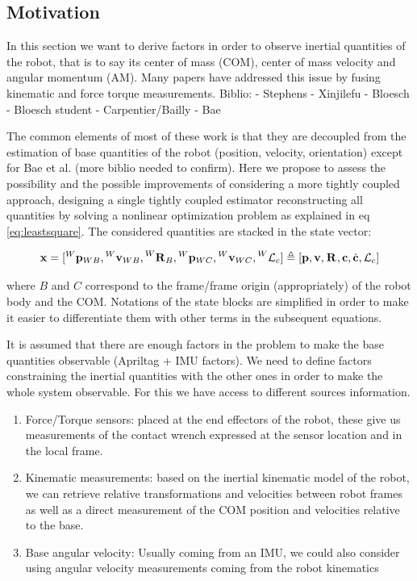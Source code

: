 \documentclass[11pt]{article}
\newcommand{\Rot}[2]{\prescript{#1}{}{\bfR}_{#2}}
\newcommand{\posi}[2]{\prescript{#1}{}{\bfp}_{#2}}
\newcommand{\vel}[2]{\prescript{#1}{}{\bfv}_{#2}}
\newcommand{\AM}{\mathcal{L}}
\newcommand{\COM}{\bfc}
\newcommand{\COMd}{\dot{\bfc}}
\begin{document}
\subsection{Motivation}
In this section we want to derive factors in order to observe inertial quantities of the robot, that is to say its center of mass (COM), center of mass velocity and angular momentum (AM). Many papers have addressed this issue by fusing kinematic and force torque measurements.
Biblio:
- Stephens
- Xinjilefu
- Bloesch
- Bloesch student
- Carpentier/Bailly
- Bae

The common elements of most of these work is that they are decoupled from the estimation of base quantities of the robot (position, velocity, orientation) except for Bae et al. (more biblio needed to confirm). Here we propose to assess the possibility and the possible improvements of considering a more tightly coupled approach, designing a single tightly coupled estimator reconstructing all quantities by solving a nonlinear optimization problem as explained in eq \ref{eq:leastsquare}. The considered quantities are stacked in the state vector: 

\begin{equation*}
\bfx = [\posi{W}{WB}, \vel{W}{WB}, \Rot{W}{B}, \posi{W}{WC}, \vel{W}{WC}, \prescript{W}{}{\AM}_{c}] 
\triangleq 
[\bfp, \bfv, \Rot{}{}, \COM, \COMd, \AM_c] 
\end{equation*}

where $B$ and $C$ correspond to the frame/frame origin (appropriately) of the robot body and the COM. Notations of the state blocks are simplified in order to make it easier to differentiate them with other terms in the subsequent equations.

It is assumed that there are enough factors in the problem to make the base quantities observable (Apriltag + IMU factors). We need to define factors constraining the inertial quantities with the other ones in order to make the whole system observable. For this we have access to different sources information.
\begin{enumerate}
    \item Force/Torque sensors: placed at the end effectors of the robot, these give us measurements of the contact wrench expressed at the sensor location and in the local frame. 
    \item Kinematic measurements: based on the inertial kinematic model of the robot, we can retrieve relative transformations and velocities between robot frames as well as a direct measurement of the COM position and velocities relative to the base.
    \item Base angular velocity: Usually coming from an IMU, we could also consider using angular velocity measurements coming from the robot kinematics
\end{enumerate}
\end{document}
